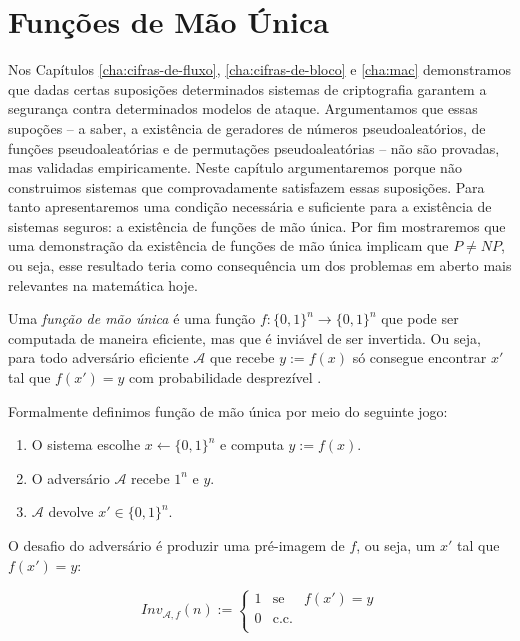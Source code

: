 \chapter{Funções de Mão Única}
\label{cha:owf}

Nos Capítulos \ref{cha:cifras-de-fluxo}, \ref{cha:cifras-de-bloco} e \ref{cha:mac} demonstramos que dadas certas suposições determinados sistemas de criptografia garantem a segurança contra determinados modelos de ataque.
Argumentamos que essas supoções -- a saber, a existência de geradores de números pseudoaleatórios, de funções pseudoaleatórias e de permutações pseudoaleatórias -- não são provadas, mas validadas empiricamente.
Neste capítulo argumentaremos porque não construimos sistemas que comprovadamente satisfazem essas suposições.
Para tanto apresentaremos uma condição necessária e suficiente para a existência de sistemas seguros: a existência de funções de mão única.
Por fim mostraremos que uma demonstração da existência de funções de mão única implicam que $P \neq NP$, ou seja, esse resultado teria como consequência um dos problemas em aberto mais relevantes na matemática hoje.

Uma {\em função de mão única} é uma função $f: \{0,1\}^n \to \{0,1\}^n$ que pode ser computada de maneira eficiente, mas que é inviável de ser invertida.
Ou seja, para todo adversário eficiente $\mathcal{A}$ que recebe $y := f(x)$ só consegue encontrar $x'$ tal que $f(x') = y$ com probabilidade desprezível \cite{Diffie76,Yao82}.

Formalmente definimos função de mão única por meio do seguinte jogo:
\begin{enumerate}
\item O sistema escolhe $x \leftarrow \{0,1\}^n$ e computa $y := f(x)$.
\item O adversário $\mathcal{A}$ recebe $1^n$ e $y$.
\item $\mathcal{A}$ devolve $x' \in \{0,1\}^n$.
\end{enumerate}

O desafio do adversário é produzir uma pré-imagem de $f$, ou seja, um $x'$ tal que $f(x') = y$:

\begin{displaymath}
  Inv_{\mathcal{A}, f}(n) := \left\{
    \begin{array}{lcl}
      1 & \textrm{se} & f(x') = y\\
      0 & \textrm{c.c.} &\\
    \end{array}
    \right.
\end{displaymath}


